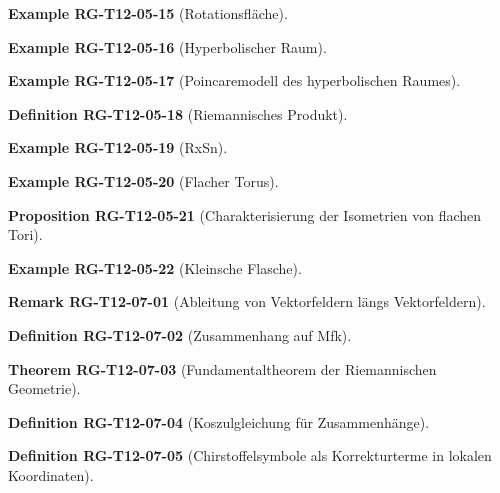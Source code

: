 \documentclass[10pt, letterpaper]{article}
\newcommand{\CustomHeading}[3]{%
  \par\medskip\noindent%
  \textbf{#1 #2} \textnormal{(#3)}.\enskip%
}
\newenvironment{DEF}[2]{\CustomHeading{Definition}{#1}{#2}}{}
\newenvironment{PROP}[2]{\CustomHeading{Proposition}{#1}{#2}}{}
\newenvironment{THEO}[2]{\CustomHeading{Theorem}{#1}{#2}}{}
\newenvironment{REM}[2]{\CustomHeading{Remark}{#1}{#2}}{}
\newenvironment{EXA}[2]{\CustomHeading{Example}{#1}{#2}}{}
\begin{document}
\begin{EXA}{RG-T12-05-15}{Rotationsfläche}
\end{EXA}

\begin{EXA}{RG-T12-05-16}{Hyperbolischer Raum}
\end{EXA}

\begin{EXA}{RG-T12-05-17}{Poincaremodell des hyperbolischen Raumes}
\end{EXA}

\begin{DEF}{RG-T12-05-18}{Riemannisches Produkt}
\end{DEF}

\begin{EXA}{RG-T12-05-19}{RxSn}
\end{EXA}

\begin{EXA}{RG-T12-05-20}{Flacher Torus}
\end{EXA}

\begin{PROP}{RG-T12-05-21}{Charakterisierung der Isometrien von flachen Tori}
\end{PROP}

\begin{EXA}{RG-T12-05-22}{Kleinsche Flasche}
\end{EXA}

\begin{REM}{RG-T12-07-01}{Ableitung von Vektorfeldern längs Vektorfeldern}
\end{REM}

\begin{DEF}{RG-T12-07-02}{Zusammenhang auf Mfk}
\end{DEF}

\begin{THEO}{RG-T12-07-03}{Fundamentaltheorem der Riemannischen Geometrie}
\end{THEO}

\begin{DEF}{RG-T12-07-04}{Koszulgleichung für Zusammenhänge}
\end{DEF}

\begin{DEF}{RG-T12-07-05}{Chirstoffelsymbole als Korrekturterme in lokalen Koordinaten}
\end{DEF}
\end{document}
